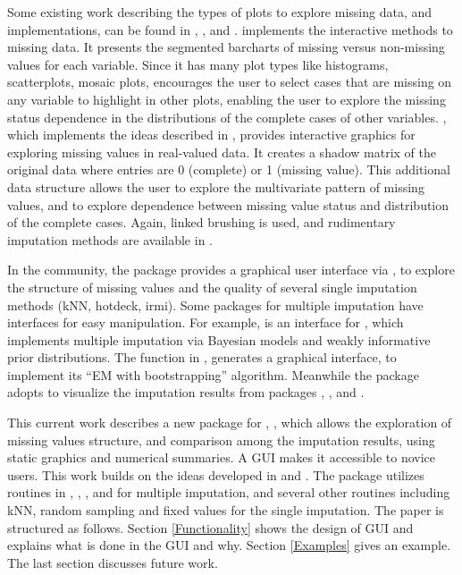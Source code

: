 \documentclass[article]{jss}
\begin{document}
Some existing work describing the types of plots to explore missing data, and implementations, can be found in \citet{unwin1996interactive}, \citet{swayne1998missing}, and \citet{templ2008visualization}.  \citep{unwin1996interactive} implements the interactive methods to missing data. It presents the segmented barcharts of missing versus non-missing values for each variable. Since it has many plot types like histograms, scatterplots, mosaic plots,  encourages the user to select cases that are missing on any variable to highlight in other plots, enabling the user to explore the missing status dependence in the distributions of the complete cases of other variables.  \citep{swayne1998xgobi}, which implements the ideas described in \citet{swayne1998missing}, provides interactive graphics for exploring missing values in real-valued data. It creates a shadow matrix of the original data where entries are 0 (complete) or 1 (missing value). This additional data structure allows the user to explore the multivariate pattern of missing values, and to explore dependence between missing value status and distribution of the complete cases. Again, linked brushing is used, and rudimentary imputation methods are available in  \citep{STLBC03}.

In the  community, the package  \citep{VIM} provides a graphical user interface via  \citep{VIMGUI}, to explore the structure of missing values and the quality of several single imputation methods (kNN, hotdeck, irmi). Some packages for multiple imputation have interfaces for easy manipulation. For example,  \citep{migui} is an interface for  \citep{mi}, which implements multiple imputation via Bayesian models and weakly informative prior distributions. The function  in  \citep{amelia}, generates a graphical interface, to implement its ``EM with bootstrapping'' algorithm. Meanwhile the package  \citep{mip} adopts  to visualize the imputation results from packages , , and .

This current work describes a new package for , , which allows the exploration of missing values structure, and comparison among the imputation results, using static graphics and numerical summaries. A GUI makes it accessible to novice users. This work builds on the ideas developed in \citet{unwin1996interactive} and \citet{swayne1998missing}. The package utilizes routines in , , , and  for multiple imputation, and several other routines including kNN, random sampling and fixed values for the single imputation. The paper is structured as follows. Section \ref{Functionality} shows the design of GUI and explains what is done in the GUI and why. Section \ref{Examples} gives an example. The last section discusses future work.
\end{document}
